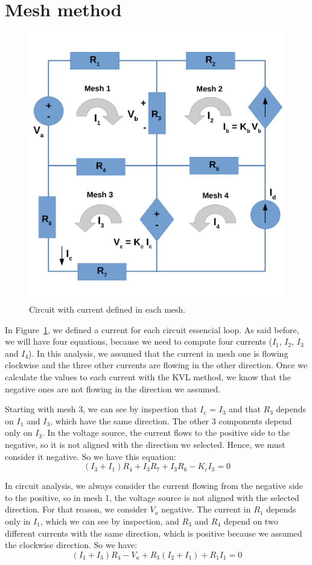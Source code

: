 \section{Mesh method}
\begin{figure}[h] \centering
\includegraphics[width=0.6\linewidth]{Circuit_Mesh.pdf}
\caption{Circuit with current defined in each mesh.}
\label{fig:Circuit_Mesh}
\end{figure}
\noindent In Figure~\ref{fig:Circuit_Mesh}, we defined a current for each circuit essencial loop.
As said before, we will have four equations, because we need to compute four currents
($I_1$, $I_2$, $I_3$ and $I_4$).
In this analysis, we assumed that the current in mesh one is flowing clockwise and the three other currents are flowing in the other direction. Once we calculate the values to each current with the KVL method, we know that the negative ones are not flowing in the direction we assumed.

\noindent Starting with mesh 3, we can see by inspection that $I_c$ = $I_3$  and that $R_3$  depends on $I_1$  and $I_3$, which have the same direction. The other 3 components depend only on $I_3$. In the voltage source, the current flows to the positive side to the negative, so it is not aligned with the direction we selected. Hence, we must consider it negative. So we have this equation:
\begin{equation}
(I_3 + I_1)R_4 + I_3R_7+I_3R_6 - K_cI_3  = 0
  \label{eq:kcl_mesh3}
\end{equation}

\noindent In circuit analysis, we always consider the current flowing from the negative side to the positive, so in mesh 1, the voltage source is not aligned with the selected direction. For that reason, we consider $V_a$ negative. The current in $R_1$ depends only in $I_1$, which we can see by inspection, and $R_3$  and $R_4$  depend on two different currents with the same direction, which is positive because we assumed the clockwise direction. So we have: 
\begin{equation}
(I_1 + I_3)R_4 - V_a + R_3(I_2 + I_1)+ R_1I_1 = 0
  \label{eq:kcl_mesh1}
\end{equation}

